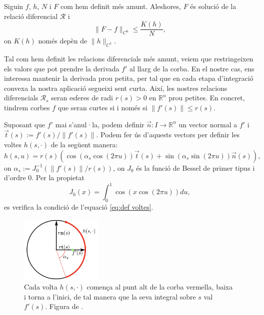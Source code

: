 \begin{lema}\label{lema:C0-1D}
    Siguin $f$, $h$, $N$ i $F$ com hem definit més amunt. Aleshores, $F$ és solució de la relació diferencial $\mathcal R$ i 
    \begin{equation}
    \|F-f\|_{C^0} \le \frac{K(h)}{N},
    \end{equation}
    on $K(h)$ només depèn de $\|h\|_{C^1}$.
\end{lema}

Tal com hem definit les relacions diferencials més amunt, veiem que restringeixen els valors que pot prendre la derivada $f'$ al llarg de la corba. En el nostre cas, ens interessa mantenir la derivada prou petita, per tal que en cada etapa d'integració convexa la nostra aplicació segueixi sent curta. Així, les nostres relacions diferencials $\mathcal R_s$ seran esferes de radi $r(s)>0$ en $\mathbb R^n$ prou petites. En concret, tindrem corbes $f$ que seran curtes si i només si $\|f'(s)\|\le r(s)$.

Suposant que $f'$ mai s'anul·la, podem definir $\vec n:I\to\mathbb R^n$ un vector normal a $f'$ i $\vec t(s):=f'(s)/\|f'(s)\|$. Podem fer ús d'aquests vectors per definir les voltes $h(s, \cdot)$ de la següent manera:
\begin{equation*}
    h(s, u) = r(s)(\cos(\alpha_s\cos(2\pi u))\vec t(s) + \sin(\alpha_s\sin(2\pi u))\vec n(s)),
\end{equation*}
on $\alpha_s := J_0^{-1}(\|f'(s)\|/r(s))$, on $J_0$ és la funció de Bessel de primer tipus i d'ordre 0. Per la propietat
\begin{equation*}
    J_0(x) = \int_0^1 \cos(x\cos(2\pi u)) du,
\end{equation*}
es verifica la condició de l'equació \eqref{eq:def voltes}.

\begin{figure}[htbp]
    \centering
    \includegraphics[width=0.35\textwidth]{J0.png}
    \caption{Cada volta $h(s,\cdot)$ comença al punt alt de la corba vermella, baixa i torna a l'inici, de tal manera que la seva integral sobre $s$ val $f'(s)$. Figura de \cite{borrelli2013}.}
    \label{fig:sisena_foto}
\end{figure}

